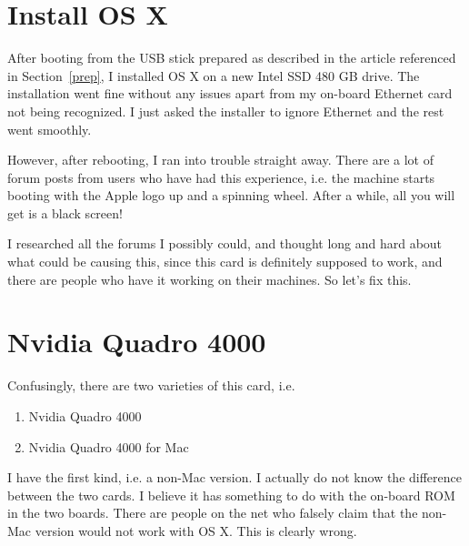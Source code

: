 \documentclass[11pt]{article}
\begin{document}
\section{Install OS X}
After booting from the USB stick prepared as described in the article referenced in Section~\ref{prep}, I installed OS X on a new Intel SSD 480 GB drive.  The installation went fine without any issues apart from my on-board Ethernet card not being recognized.  I just asked the installer to ignore Ethernet and the rest went smoothly.

However, after rebooting, I ran into trouble straight away.  There are a lot of forum posts from users who have had this experience, i.e. the machine starts booting with the Apple logo up and a spinning wheel.  After a while, all you will get is a black screen!

I researched all the forums I possibly could, and thought long and hard about what could be causing this, since this card is definitely supposed to work, and there are people who have it working on their machines.   So let's fix this.

\section{Nvidia Quadro 4000}

Confusingly, there are two varieties of this card, i.e.
\begin{enumerate}
\item Nvidia Quadro 4000
\item Nvidia Quadro 4000 for Mac
\end{enumerate}
I have the first kind, i.e. a non-Mac version.  I actually do not know the difference between the two cards. I believe it has something to do with the on-board ROM in the two boards.  There are people on the net who falsely claim that the non-Mac version would not work with OS X.  This is clearly wrong.
\end{document}
